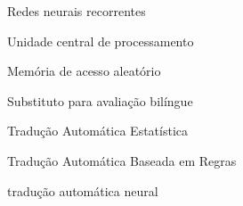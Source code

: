 \begin{siglas}
  \item[RNN] Redes neurais recorrentes
  \item[CPU] Unidade central de processamento 
  \item[RAM] Memória de acesso aleatório
  \item[BLEU] Substituto para avaliação bilíngue
  \item[SMT] Tradução Automática Estatística
  \item[RBMT] Tradução Automática Baseada em Regras
  \item[NMT]  tradução automática neural
\end{siglas}
